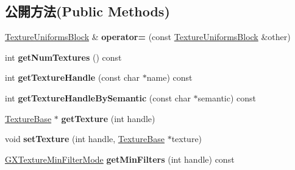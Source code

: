 \subsection*{公開方法(Public Methods)}
\begin{DoxyCompactItemize}
\item 
\hyperlink{class_magnum_1_1_texture_uniforms_block}{Texture\+Uniforms\+Block} \& {\bfseries operator=} (const \hyperlink{class_magnum_1_1_texture_uniforms_block}{Texture\+Uniforms\+Block} \&other)\hypertarget{class_magnum_1_1_texture_uniforms_block_a4486fb3e3aee498f9bafbb0b2979f7b4}{}\label{class_magnum_1_1_texture_uniforms_block_a4486fb3e3aee498f9bafbb0b2979f7b4}

\item 
int {\bfseries get\+Num\+Textures} () const \hypertarget{class_magnum_1_1_texture_uniforms_block_abdd0f19fffb45b4bf68e58857a269953}{}\label{class_magnum_1_1_texture_uniforms_block_abdd0f19fffb45b4bf68e58857a269953}

\item 
int {\bfseries get\+Texture\+Handle} (const char $\ast$name) const \hypertarget{class_magnum_1_1_texture_uniforms_block_a0e286b56e5a24023faa6f43af26c3550}{}\label{class_magnum_1_1_texture_uniforms_block_a0e286b56e5a24023faa6f43af26c3550}

\item 
int {\bfseries get\+Texture\+Handle\+By\+Semantic} (const char $\ast$semantic) const \hypertarget{class_magnum_1_1_texture_uniforms_block_a027e8943d5344f71792b4ac581ff1725}{}\label{class_magnum_1_1_texture_uniforms_block_a027e8943d5344f71792b4ac581ff1725}

\item 
\hyperlink{class_magnum_1_1_texture_base}{Texture\+Base} $\ast$ {\bfseries get\+Texture} (int handle)\hypertarget{class_magnum_1_1_texture_uniforms_block_aec3ab5e921a529fdbe55a97fcbaed857}{}\label{class_magnum_1_1_texture_uniforms_block_aec3ab5e921a529fdbe55a97fcbaed857}

\item 
void {\bfseries set\+Texture} (int handle, \hyperlink{class_magnum_1_1_texture_base}{Texture\+Base} $\ast$texture)\hypertarget{class_magnum_1_1_texture_uniforms_block_a2de9fd4655163383e0a56bf0b6eec342}{}\label{class_magnum_1_1_texture_uniforms_block_a2de9fd4655163383e0a56bf0b6eec342}

\item 
\hyperlink{class_magnum_1_1_g_x_texture_min_filter_mode}{G\+X\+Texture\+Min\+Filter\+Mode} {\bfseries get\+Min\+Filters} (int handle) const \hypertarget{class_magnum_1_1_texture_uniforms_block_adbfda67c89a4541b22878408532081b8}{}\label{class_magnum_1_1_texture_uniforms_block_adbfda67c89a4541b22878408532081b8}


\end{DoxyCompactItemize}

